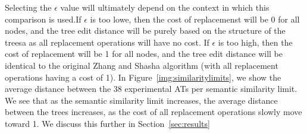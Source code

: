 
Selecting the $\epsilon$ value will ultimately depend on the context in which this comparison is used.If $\epsilon$ is too lowe, then the cost of replacemenst will be 0 for all nodes, and the tree edit distance will be purely based on the structure of the treesa as all replacement operations will have no cost. If $\epsilon$ is too high, then the cost of replacement will be 1 for all nodes, and the tree edit distance will be identical to the original Zhang and Shasha algorithm (with all replacement operations having a cost of 1). In Figure~\ref{img:similaritylimits}, we show the average distance between the 38 experimental ATs per semantic similarity limit. We see that as the semantic similarity limit increases, the average distance between the trees increases, as the cost of all replacement operations slowly move toward 1. We discuss this further in Section~\ref{sec:results}